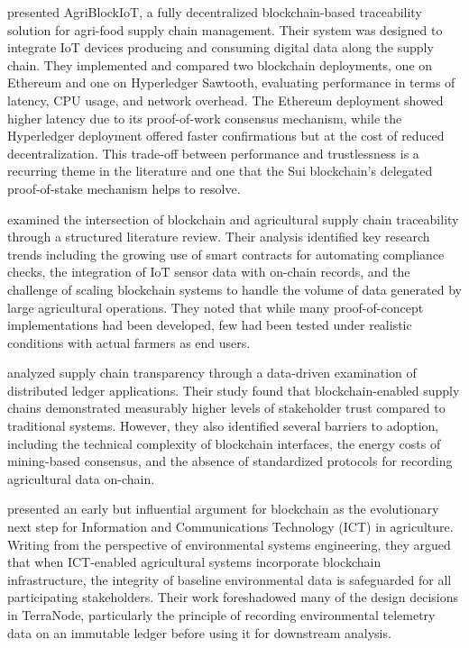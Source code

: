 \textcite{caro2018blockchain} presented AgriBlockIoT, a fully decentralized blockchain-based traceability solution for agri-food supply chain management. Their system was designed to integrate IoT devices producing and consuming digital data along the supply chain. They implemented and compared two blockchain deployments, one on Ethereum and one on Hyperledger Sawtooth, evaluating performance in terms of latency, CPU usage, and network overhead. The Ethereum deployment showed higher latency due to its proof-of-work consensus mechanism, while the Hyperledger deployment offered faster confirmations but at the cost of reduced decentralization. This trade-off between performance and trustlessness is a recurring theme in the literature and one that the Sui blockchain's delegated proof-of-stake mechanism helps to resolve.

\textcite{mirabelli2020blockchain} examined the intersection of blockchain and agricultural supply chain traceability through a structured literature review. Their analysis identified key research trends including the growing use of smart contracts for automating compliance checks, the integration of IoT sensor data with on-chain records, and the challenge of scaling blockchain systems to handle the volume of data generated by large agricultural operations. They noted that while many proof-of-concept implementations had been developed, few had been tested under realistic conditions with actual farmers as end users.

\textcite{rahman2025enhancing} analyzed supply chain transparency through a data-driven examination of distributed ledger applications. Their study found that blockchain-enabled supply chains demonstrated measurably higher levels of stakeholder trust compared to traditional systems. However, they also identified several barriers to adoption, including the technical complexity of blockchain interfaces, the energy costs of mining-based consensus, and the absence of standardized protocols for recording agricultural data on-chain.

\textcite{lin2017blockchain} presented an early but influential argument for blockchain as the evolutionary next step for Information and Communications Technology (ICT) in agriculture. Writing from the perspective of environmental systems engineering, they argued that when ICT-enabled agricultural systems incorporate blockchain infrastructure, the integrity of baseline environmental data is safeguarded for all participating stakeholders. Their work foreshadowed many of the design decisions in TerraNode, particularly the principle of recording environmental telemetry data on an immutable ledger before using it for downstream analysis.

